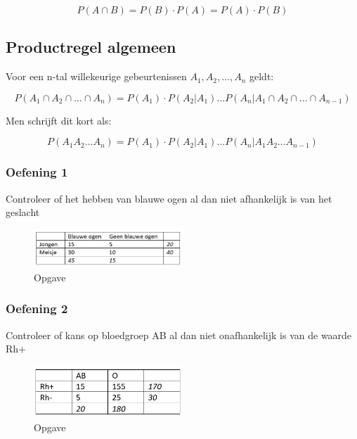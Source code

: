 \documentclass{article}
\begin{document}
\begin{equation}
    P(A \cap B) = P(B) \cdot P(A) = P(A) \cdot P(B)
\end{equation}

\subsection{Productregel algemeen}

Voor een n-tal willekeurige gebeurtenissen $A_1, A_2, \dots, A_n$ geldt:

\begin{equation}
    P(A_1 \cap A_2 \cap \dots \cap A_n) = P(A_1) \cdot P(A_2 | A_1) \dots P(A_n | A_1 \cap A_2 \cap \dots \cap A_{n-1})
\end{equation}

Men schrijft dit kort als:

\begin{equation}
    P(A_1 A_2 \dots A_n) = P(A_1) \cdot P(A_2 | A_1) \dots P(A_n | A_1 A_2 \dots A_{n-1})
\end{equation}

\subsubsection{Oefening 1}

Controleer of het hebben van blauwe ogen al dan niet afhankelijk is van het geslacht

\begin{figure}[H]
    \centering
    \includegraphics[width=0.5\textwidth]{vkans-productregel-oef.png}
    \caption{Opgave}
\end{figure}


\subsubsection{Oefening 2}

Controleer of kans op bloedgroep AB al dan niet onafhankelijk is van de waarde Rh+

\begin{figure}[H]
    \centering
    \includegraphics[width=0.5\textwidth]{vkans-productregel-oef2.png}
    \caption{Opgave}
\end{figure}
\end{document}
